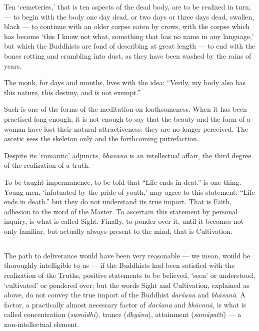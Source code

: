 \documentclass[a4paper, 11pt, oneside, english, landscape]{article}
\begin{document}
Ten `cemeteries,' that is ten aspects of the dead body, are to be realized in turn, --- to begin with the body one day dead, or two days or three days dead, swollen, black --- to continue with an older corpse eaten by crows, with the corpse which has become `this I know not what, something that has no name in any language,' but which the Buddhists are fond of describing at great length --- to end with the bones rotting and crumbling into dust, as they have been washed by the rains of years.

The monk, for days and months, lives with the idea: ``Verily, my body also has this nature, this destiny, and is not exempt.''

Such is one of the forms of the meditation on loathsomeness. When it has been practised long enough, it is not enough to say that the beauty and the form of a woman have lost their natural attractiveness: they are no longer perceived. The ascetic sees the skeleton only and the forthcoming putrefaction.

Despite its `romantic' adjuncts, \emph{bhāvanā} is an intellectual affair, the third degree of the realization of a truth.

To be taught impermanence, to be told that ``Life ends in deat.'' is one thing. Young men, `infatuated by the pride of youth,' may agree to this statement: ``Life ends in death.'' but they do not understand its true import. That is Faith, adhesion to the word of the Master. To ascertain this statement by personal inquiry, is what is called Sight. Finally, to ponder over it, until it becomes not only familiar, but actually always present to the mind, that is Cultivation.

\subsection{}
\paragraph{}
The path to deliverance would have been very reasonable --- we mean, would be thoroughly intelligible to us --- if the Buddhists had been satisfied with the realization of the Truths, positive statements to be believed, `seen' or understood, `cultivated' or pondered over; but the words Sight and Cultivation, explained as above, do not convey the true import of the Buddhist \emph{darśana} and \emph{bhāvanā}. A factor, a practically almost necessary factor of \emph{darśana} and \emph{bhāvanā}, is what is called concentration (\emph{samādhi}), trance (\emph{dhyāna}), attainment (\emph{samāpatti}) --- a non-intellectual element.
\end{document}
